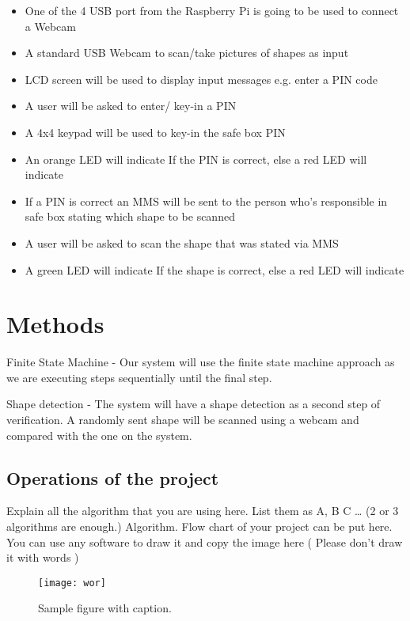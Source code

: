 \documentclass[10pt,sigconf, review]{article}
\begin{document}
\begin{itemize}
  \item {One of the 4 USB port from the Raspberry Pi is going to be used to connect a Webcam}
  \item {A standard USB Webcam to scan/take pictures of shapes as input}
  \item {LCD screen will be used to display input messages e.g. enter a PIN code}
  \item {A user will be asked to enter/ key-in a PIN}
  \item {A 4x4 keypad will be used to key-in the safe box PIN}
  \item {An orange LED will indicate If the PIN is correct, else a red LED will indicate}
  \item {If a PIN is correct an MMS will be sent to the person who’s responsible in safe box stating which shape to be scanned}
  \item {A user will be asked to scan the shape that was stated via MMS}
  \item {A green LED will indicate If the shape is correct, else a red LED will indicate}
\end{itemize}

\section{Methods}

Finite State Machine - Our system will use the finite state machine approach as
we are executing steps sequentially until the final step.

Shape detection - The system will have a shape detection as a second step of verification. A randomly sent shape will be scanned using a webcam and compared with the one on the system.


\subsection{Operations of the project}

Explain all the algorithm that you are using here. List them as A, B C … (2 or
3 algorithms are enough.) Algorithm. Flow chart of your project can be put
here. You can use any software to draw it and copy the image here ( Please
don’t draw it with words )


\begin{figure}[thb]
    \centering
	\texttt{[image: wor]}
	\caption{Sample figure with caption.}
	\label{fig: sample-figure}       %
\end{figure}
\end{document}
